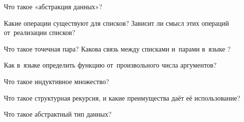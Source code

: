 \begin{Queeze}

 \item Что такое «абстракция данных»?

 \item Какие операции существуют для списков? Зависит ли смысл этих операций от~реализации списков?

 \item Что такое точечная пара? Какова связь между списками и~парами в~языке \Scheme?

 \item Как в~языке \Scheme определить функцию от~произвольного числа аргументов?

 \item Что такое индуктивное множество?

 \item Что такое структурная рекурсия, и какие преимущества даёт её использование?
 
 \item Что такое абстрактный тип данных?


\end{Queeze}
\endinput